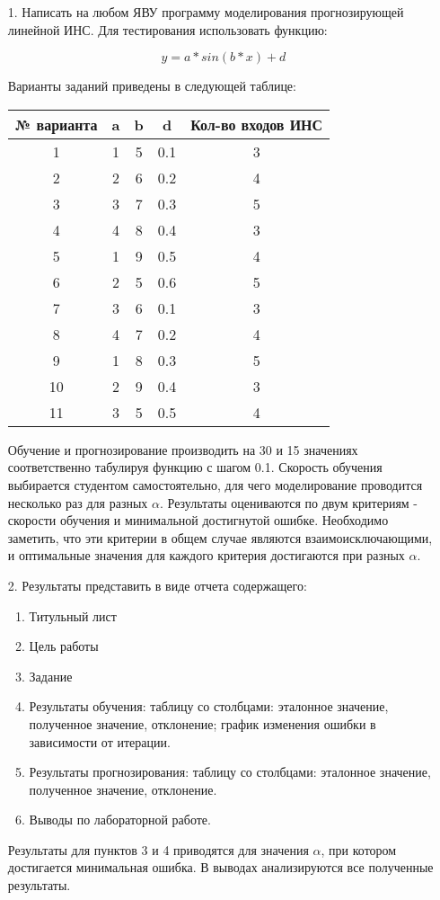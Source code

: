 \begin{enumerate}
  \item [1.] Написать на любом ЯВУ программу моделирования прогнозирующей линейной ИНС.
  Для тестирования использовать функцию:

$$
y = a * sin(b * x) + d
$$

Варианты заданий приведены в следующей таблице:

\begin{tabular}{ | c | c | c | c | c | }
  \hline
  № варианта & a	& b	& d	& Кол-во входов ИНС\\
  \hline
  1	  & 1 & 5 & 0.1 & 3 \\
  2	  & 2 & 6 & 0.2 & 4 \\
  3	  & 3 & 7 & 0.3 & 5 \\
  4	  & 4 & 8 & 0.4 & 3 \\
  5	  & 1 & 9 & 0.5 & 4 \\
  6	  & 2 & 5 & 0.6 & 5 \\
  7	  & 3 & 6 & 0.1 & 3 \\
  8	  & 4 & 7 & 0.2 & 4 \\
  9	  & 1 & 8 & 0.3 & 5 \\
  10	& 2 & 9 & 0.4 & 3 \\
  11	& 3 & 5 & 0.5 & 4 \\
  \hline
\end{tabular}

Обучение и прогнозирование производить на 30 и 15 значениях соответственно табулируя функцию с шагом 0.1. Скорость обучения выбирается студентом самостоятельно, для чего моделирование проводится несколько раз для разных $\alpha$. Результаты оцениваются по двум критериям - скорости обучения и минимальной достигнутой ошибке. Необходимо заметить, что эти критерии в общем случае являются взаимоисключающими, и оптимальные значения для каждого критерия достигаются при разных $\alpha$. 

  \item [2.] Результаты представить в виде отчета содержащего:
  
  \begin{enumerate}
    \item Титульный лист
    \item Цель работы
    \item Задание
    \item Результаты обучения: таблицу  со столбцами: эталонное значение, полученное значение, отклонение; график изменения ошибки в зависимости от итерации.
    \item Результаты прогнозирования: таблицу  со столбцами: эталонное значение, полученное значение, отклонение.
    \item Выводы по лабораторной работе.
  \end{enumerate}
  
  Результаты для пунктов 3 и 4 приводятся для значения $\alpha$, при котором достигается минимальная ошибка. В выводах анализируются все полученные результаты.
  
\end{enumerate}

